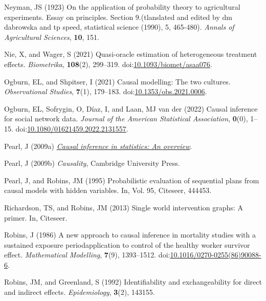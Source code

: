 \documentclass[
  singlecolumn,
  9pt]{article}
\begin{document}
\begin{CSLReferences}
Neyman, JS (1923) On the application of probability theory to
agricultural experiments. Essay on principles. Section 9.(tlanslated and
edited by dm dabrowska and tp speed, statistical science (1990), 5,
465-480). \emph{Annals of Agricultural Sciences}, \textbf{10}, 151.

Nie, X, and Wager, S (2021) Quasi-oracle estimation of heterogeneous
treatment effects. \emph{Biometrika}, \textbf{108}(2), 299--319.
doi:\href{https://doi.org/10.1093/biomet/asaa076}{10.1093/biomet/asaa076}.

Ogburn, EL, and Shpitser, I (2021) Causal modelling: The two cultures.
\emph{Observational Studies}, \textbf{7}(1), 179--183.
doi:\href{https://doi.org/10.1353/obs.2021.0006}{10.1353/obs.2021.0006}.

Ogburn, EL, Sofrygin, O, Díaz, I, and Laan, MJ van der (2022) Causal
inference for social network data. \emph{Journal of the American
Statistical Association}, \textbf{0}(0), 1--15.
doi:\href{https://doi.org/10.1080/01621459.2022.2131557}{10.1080/01621459.2022.2131557}.

Pearl, J (2009a) \emph{\href{https://doi.org/10.1214/09-SS057}{Causal
inference in statistics: An overview}}.

Pearl, J (2009b) \emph{Causality}, Cambridge University Press.

Pearl, J, and Robins, JM (1995) Probabilistic evaluation of sequential
plans from causal models with hidden variables. In, Vol. 95, Citeseer,
444453.

Richardson, TS, and Robins, JM (2013) Single world intervention graphs:
A primer. In, Citeseer.

Robins, J (1986) A new approach to causal inference in mortality studies
with a sustained exposure period{\textemdash}application to control of
the healthy worker survivor effect. \emph{Mathematical Modelling},
\textbf{7}(9), 1393--1512.
doi:\href{https://doi.org/10.1016/0270-0255(86)90088-6}{10.1016/0270-0255(86)90088-6}.

Robins, JM, and Greenland, S (1992) Identifiability and exchangeability
for direct and indirect effects. \emph{Epidemiology}, \textbf{3}(2),
143155.


\end{CSLReferences}
\end{document}

